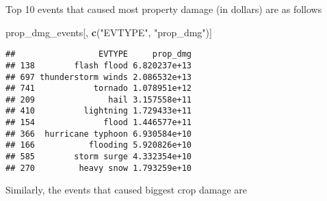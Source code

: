 \documentclass[]{article}
\newenvironment{Shaded}{\begin{snugshade}}{\end{snugshade}}
\newcommand{\KeywordTok}[1]{\textcolor[rgb]{0.13,0.29,0.53}{\textbf{#1}}}
\newcommand{\DataTypeTok}[1]{\textcolor[rgb]{0.13,0.29,0.53}{#1}}
\newcommand{\DecValTok}[1]{\textcolor[rgb]{0.00,0.00,0.81}{#1}}
\newcommand{\StringTok}[1]{\textcolor[rgb]{0.31,0.60,0.02}{#1}}
\newcommand{\CommentTok}[1]{\textcolor[rgb]{0.56,0.35,0.01}{\textit{#1}}}
\newcommand{\OperatorTok}[1]{\textcolor[rgb]{0.81,0.36,0.00}{\textbf{#1}}}
\newcommand{\NormalTok}[1]{#1}
\begin{document}
\begin{Shaded}
\end{Shaded}

Top 10 events that caused most property damage (in dollars) are as
follows

\begin{Shaded}
\begin{Highlighting}[]
\NormalTok{prop_dmg_events[, }\KeywordTok{c}\NormalTok{(}\StringTok{"EVTYPE"}\NormalTok{, }\StringTok{"prop_dmg"}\NormalTok{)]}
\end{Highlighting}
\end{Shaded}

\begin{verbatim}
##                 EVTYPE     prop_dmg
## 138        flash flood 6.820237e+13
## 697 thunderstorm winds 2.086532e+13
## 741            tornado 1.078951e+12
## 209               hail 3.157558e+11
## 410          lightning 1.729433e+11
## 154              flood 1.446577e+11
## 366  hurricane typhoon 6.930584e+10
## 166           flooding 5.920826e+10
## 585        storm surge 4.332354e+10
## 270         heavy snow 1.793259e+10
\end{verbatim}

Similarly, the events that caused biggest crop damage are
\end{document}
